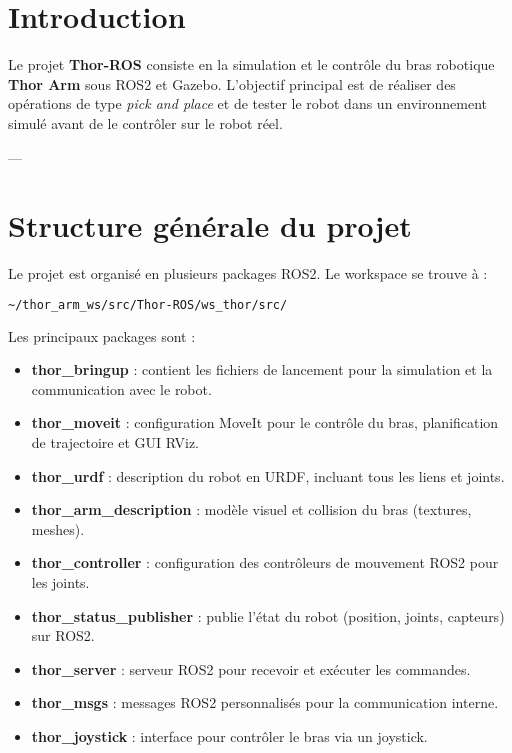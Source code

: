 \documentclass[a4paper,12pt]{article}
\numberwithin{equation}{section}
\begin{document}

\tableofcontents
\newpage

\section{Introduction}
Le projet \textbf{Thor-ROS} consiste en la simulation et le contrôle du bras robotique \textbf{Thor Arm} sous ROS2 et Gazebo.  
L'objectif principal est de réaliser des opérations de type \textit{pick and place} et de tester le robot dans un environnement simulé avant de le contrôler sur le robot réel.  

---

\section{Structure générale du projet}

Le projet est organisé en plusieurs packages ROS2. Le workspace se trouve à :

\begin{lstlisting}[language=bash]
~/thor_arm_ws/src/Thor-ROS/ws_thor/src/
\end{lstlisting}

Les principaux packages sont :

\begin{itemize}
    \item \textbf{thor\_bringup} : contient les fichiers de lancement pour la simulation et la communication avec le robot.
    \item \textbf{thor\_moveit} : configuration MoveIt pour le contrôle du bras, planification de trajectoire et GUI RViz.
    \item \textbf{thor\_urdf} : description du robot en URDF, incluant tous les liens et joints.
    \item \textbf{thor\_arm\_description} : modèle visuel et collision du bras (textures, meshes).
    \item \textbf{thor\_controller} : configuration des contrôleurs de mouvement ROS2 pour les joints.
    \item \textbf{thor\_status\_publisher} : publie l'état du robot (position, joints, capteurs) sur ROS2.
    \item \textbf{thor\_server} : serveur ROS2 pour recevoir et exécuter les commandes.
    \item \textbf{thor\_msgs} : messages ROS2 personnalisés pour la communication interne.
    \item \textbf{thor\_joystick} : interface pour contrôler le bras via un joystick.
\end{itemize}
\end{document}
